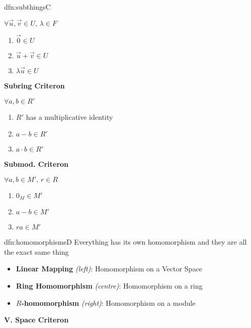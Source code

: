 \documentclass[landscape, 8pt]{extarticle}
\begin{document}
\begin{multicols}{3}
\begin{dfn}{dfn:subthings}{C}
\begin{multicols}{3}
        $\forall\vec{u}, \vec{v}\in U,\,\lambda\in F$
        \begin{enumerate}[leftmargin=*]
            \item $\vec{0}\in U$
            \item $\vec{u} + \vec{v} \in U$
            \item $\lambda \vec{u}\in U$
        \end{enumerate}
        \columnbreak    

        \textbf{Subring Criteron}

        $\forall a, b\in R'$
        \begin{enumerate}[leftmargin=*]
            \item $R'$ has a multiplicative identity
            \item $a - b \in R'$
            \item $a \cdot b\in R'$
        \end{enumerate}

        \columnbreak

        \textbf{Submod. Criteron}

        $\forall a, b\in M',\,r\in R$
        \begin{enumerate}[leftmargin=*]
            \item $0_{M}\in M'$
            \item $a - b \in M'$
            \item $ra\in M'$
        \end{enumerate}
    \end{multicols}
    \setlength{\columnseprule}{0pt}
\end{dfn}

\vspace{-5pt}
\begin{dfn}{dfn:homomorphisms}{D}
    Everything has its own homomorphism and they are all the exact same thing
    \vspace{-5pt}
    \begin{itemize}
        \setlength\itemsep{0em}
        \item \textbf{Linear Mapping} \textit{(left)}: Homomorphism on a Vector Space
        \item \textbf{Ring Homomorphism} \textit{(centre)}: Homomorphism on a ring
        \item \textbf{$R$-homomorphism} \textit{(right)}: Homomorphism on a module
    \end{itemize}

    \vspace{-20pt}
    \setlength{\columnseprule}{0.5pt}
    \begin{multicols}{3}
        \textbf{V. Space Criteron}


\end{multicols}
\end{dfn}
\end{multicols}
\end{document}

